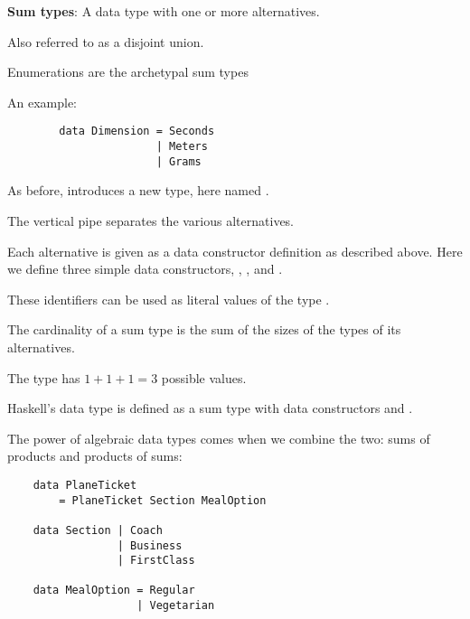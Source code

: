\begin{notelist}
\begin{notelist}
    \item \textbf{Sum types}: A data type with one or more alternatives.
    \begin{notelist}
        \item Also referred to as a disjoint union.
        \item Enumerations are the archetypal sum types
        \item An example:
        \begin{lstlisting}
        data Dimension = Seconds
                       | Meters
                       | Grams
        \end{lstlisting}
        \begin{notelist}
            \item As before,  introduces a new type, here named .
            \item The vertical pipe \code{|} separates the various alternatives.
            \item Each alternative is given as a data constructor definition as described above.
                  Here we define three simple data constructors, , , and
                  .
            \item These identifiers can be used as literal values of the type . 
        \end{notelist}
        \item The cardinality of a sum type is the sum of the sizes of the types of its alternatives.
        \item The type  has $1 + 1 + 1 = 3$ possible values.
        \item Haskell's  data type is defined as a sum type with data constructors  and .
    \end{notelist}

    \item The power of algebraic data types comes when we combine the two: sums of products and products of sums:
    \begin{lstlisting}
    data PlaneTicket
        = PlaneTicket Section MealOption

    data Section | Coach
                 | Business
                 | FirstClass

    data MealOption = Regular
                    | Vegetarian


\end{lstlisting}
\end{notelist}
\end{notelist}

